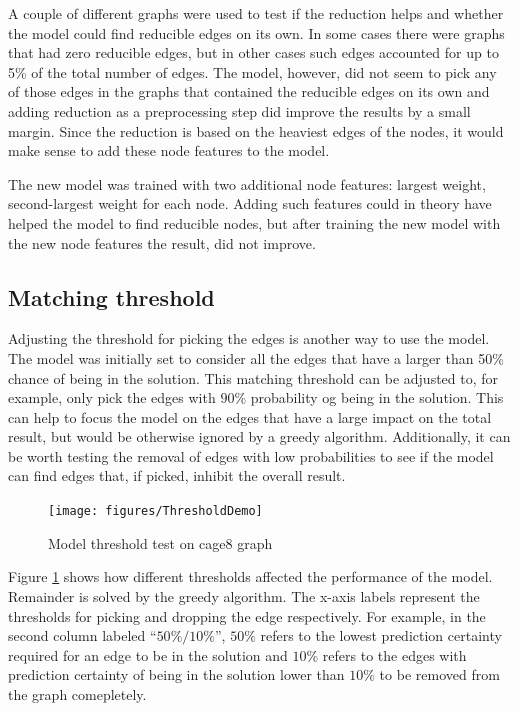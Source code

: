 A couple of different graphs were used to test if the reduction helps and whether the model could find reducible edges on its own. In some cases there were graphs that had zero reducible edges, but in other cases such edges accounted for up to 5\% of the total number of edges. The model, however, did not seem to pick any of those edges in the graphs that contained the reducible edges on its own and adding reduction as a preprocessing step did improve the results by a small margin. Since the reduction is based on the heaviest edges of the nodes, it would make sense to add these node features to the model. 

The new model was trained with two additional node features: largest weight, second-largest weight for each node. Adding such features could in theory have helped the model to find reducible nodes, but after training the new model with the new node features the result, did not improve.

\subsection{Matching threshold}

Adjusting the threshold for picking the edges is another way to use the model. The model was initially set to consider all the edges that have a larger than 50\% chance of being in the solution. This matching threshold can be adjusted to, for example, only pick the edges with $90\%$ probability og being in the solution. This can help to focus the model on the edges that have a large impact on the total result, but would be otherwise ignored by a greedy algorithm. Additionally, it can be worth testing the removal of edges with low probabilities to see if the model can find edges that, if picked, inhibit the overall result.

\begin{figure}[H]
    \centering
    \hspace*{-1cm}
    \texttt{[image: figures/ThresholdDemo]}
    \caption{Model threshold test on cage8 graph}
    \label{Model threshold test}
\end{figure}

Figure \ref{Model threshold test} shows how different thresholds affected the performance of the model. Remainder is solved by the greedy algorithm. The x-axis labels represent the thresholds for picking and dropping the edge respectively. For example, in the second column labeled “$50\% / 10\%$”, $50\%$ refers to the lowest prediction certainty required for an edge to be in the solution and $10\%$ refers to the edges with prediction certainty of being in the solution lower than $10\%$ to be removed from the graph comepletely.

